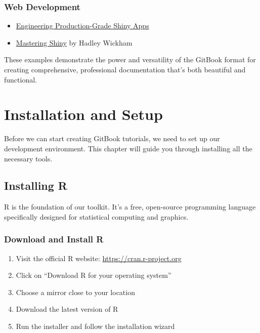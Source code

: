 \documentclass[
]{book}
\providecommand{\tightlist}{%
  \setlength{\itemsep}{0pt}\setlength{\parskip}{0pt}}
\begin{document}
\subsection{Web Development}\label{web-development}

\begin{itemize}
\tightlist
\item
  \href{https://engineering-shiny.org/}{Engineering Production-Grade Shiny Apps}
\item
  \href{https://mastering-shiny.org/}{Mastering Shiny} by Hadley Wickham
\end{itemize}

These examples demonstrate the power and versatility of the GitBook format for creating comprehensive, professional documentation that's both beautiful and functional.

\chapter{Installation and Setup}\label{install}

Before we can start creating GitBook tutorials, we need to set up our development environment. This chapter will guide you through installing all the necessary tools.

\section{Installing R}\label{installing-r}

R is the foundation of our toolkit. It's a free, open-source programming language specifically designed for statistical computing and graphics.

\subsection{Download and Install R}\label{download-and-install-r}

\begin{enumerate}
\def\labelenumi{\arabic{enumi}.}
\tightlist
\item
  Visit the official R website: \url{https://cran.r-project.org}
\item
  Click on ``Download R for your operating system''
\item
  Choose a mirror close to your location
\item
  Download the latest version of R
\item
  Run the installer and follow the installation wizard
\end{enumerate}
\end{document}
